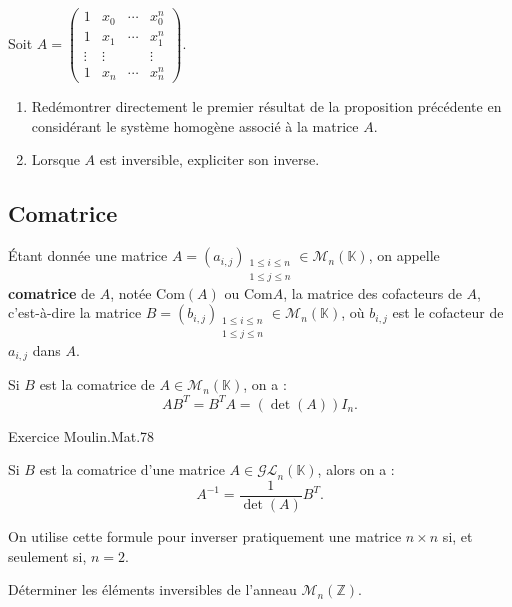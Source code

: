 \documentclass[french]{article}
\newcommand{\Z}{\mathbb{Z}}
\newcommand{\K}{\mathbb{K}}
\newcommand{\inv}{^{-1}}
\theoremstyle{plain}
\theoremstyle{definition}
\theoremstyle{remark}
\begin{document}
\begin{exo}
	Soit $A=\begin{pmatrix}
		1&x_0&\cdots&x_0^n\\
		1&x_1&\cdots&x_1^n\\
		\vdots&\vdots&&\vdots\\
		1&x_n&\cdots&x_n^n
	\end{pmatrix}$.
	\begin{enumerate}
		\item Redémontrer directement le premier résultat de la proposition précédente en considérant le système homogène associé à la matrice $A$.
		\item Lorsque $A$ est inversible, expliciter son inverse.
	\end{enumerate}
\end{exo}

\subsection{Comatrice}

\begin{dfn}
	Étant donnée une matrice $A=(a_{i,j})_{\substack{1\leqslant i\leqslant n\\
	1\leqslant j\leqslant n}}\in\mathcal{M}_n(\K)$, on appelle \textbf{comatrice} de $A$, notée $\text{Com}(A)$ ou $\text{Com}A$, la matrice des cofacteurs de $A$, c'est-à-dire la matrice $B=(b_{i,j})_{\substack{1\leqslant i\leqslant n\\
	1\leqslant j\leqslant n}}\in\mathcal{M}_n(\K)$, où $b_{i,j}$ est le cofacteur de $a_{i,j}$ dans $A$.
\end{dfn}

\begin{prop}%
	Si $B$ est la comatrice de $A\in\mathcal{M}_n(\K)$, on a :
	$$AB^T=B^TA=(\det(A))I_n.$$
\end{prop}

Exercice Moulin.Mat.78

\begin{cor}%
	Si $B$ est la comatrice d'une matrice $A\in\mathcal{GL}_n(\K)$, alors on a :
	$$A\inv=\frac{1}{\det(A)}B^T.$$
\end{cor}

\begin{met}
	On utilise cette formule pour inverser pratiquement une matrice $n\times n$ si, et seulement si, $n=2$.
\end{met}

\begin{exo}
	Déterminer les éléments inversibles de l'anneau $\mathcal{M}_n(\Z)$.
\end{exo}
\end{document}
